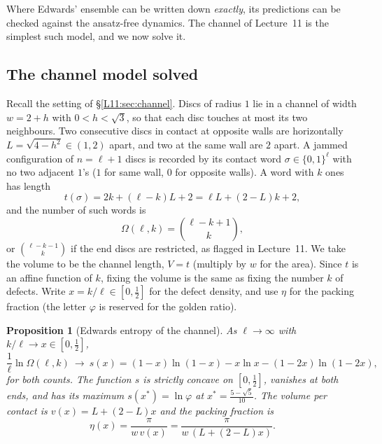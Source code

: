 \documentclass[11pt,openany]{book}
\theoremstyle{plain}
\newtheorem{proposition}[theorem]{Proposition}
\theoremstyle{definition}
\theoremstyle{remark}
\begin{document}
Where Edwards' ensemble can be written down \emph{exactly}, its predictions can be checked against the
ansatz-free dynamics. The channel of Lecture~11 is the simplest such model, and we now solve it.

\subsection{The channel model solved}
\label{SM:sec:channel}

Recall the setting of \S\ref{L11:sec:channel}. Discs of radius $1$ lie in a channel of width $w=2+h$
with $0<h<\sqrt3$, so that each disc touches at most its two neighbours. Two consecutive discs in
contact at opposite walls are horizontally $L=\sqrt{4-h^2}\in(1,2)$ apart, and two at the same wall are
$2$ apart. A jammed configuration of $n=\ell+1$ discs is recorded by its contact word
$\sigma\in\{0,1\}^\ell$ with no two adjacent $1$'s ($1$ for same wall, $0$ for opposite walls). A word
with $k$ ones has length
\[
  t(\sigma)=2k+(\ell-k)L+2=\ell L+(2-L)k+2,
\]
and the number of such words is
\[
  \Omega(\ell,k)=\binom{\ell-k+1}{k},
\]
or $\binom{\ell-k-1}{k}$ if the end discs are restricted, as flagged in Lecture~11.
We take the volume to be the channel length, $V=t$ (multiply by $w$ for the area). Since $t$ is an affine
function of $k$, fixing the volume is the same as fixing the number $k$ of defects. Write
$x=k/\ell\in[0,\frac12]$ for the defect density, and use $\eta$ for the packing fraction (the letter
$\varphi$ is reserved for the golden ratio).

\begin{proposition}[Edwards entropy of the channel]\label{SM:prop:entropy}
As $\ell\to\infty$ with $k/\ell\to x\in[0,\frac12]$,
\[
  \frac1\ell\ln\Omega(\ell,k)\ \longrightarrow\ s(x)=(1-x)\ln(1-x)-x\ln x-(1-2x)\ln(1-2x),
\]
for both counts. The function $s$ is strictly concave on $[0,\frac12]$, vanishes at both ends, and has
its maximum $s(x^*)=\ln\varphi$ at $x^*=\frac{5-\sqrt5}{10}$. The volume per contact is
$v(x)=L+(2-L)x$ and the packing fraction is
\[
  \eta(x)=\frac{\pi}{w\,v(x)}=\frac{\pi}{w\,(L+(2-L)x)} .
\]
\end{proposition}
\end{document}
